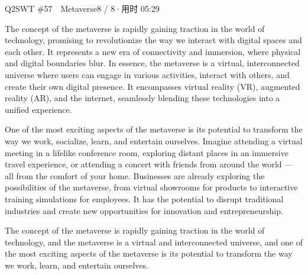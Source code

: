 \begin{qblock}{Q2\quad SWT \#57\ \ Metaverse}{8 / 8\quad·\quad 用时 05:29}

\begin{promptbox}
The concept of the metaverse is rapidly gaining traction in the world of technology, promising to revolutionize the way we interact with digital spaces and each other. It represents a new era of connectivity and immersion, where physical and digital boundaries blur. In essence, the metaverse is a virtual, interconnected universe where users can engage in various activities, interact with others, and create their own digital presence. It encompasses virtual reality (VR), augmented reality (AR), and the internet, seamlessly blending these technologies into a unified experience.

One of the most exciting aspects of the metaverse is its potential to transform the way we work, socialize, learn, and entertain ourselves. Imagine attending a virtual meeting in a lifelike conference room, exploring distant places in an immersive travel experience, or attending a concert with friends from around the world — all from the comfort of your home. Businesses are already exploring the possibilities of the metaverse, from virtual showrooms for products to interactive training simulations for employees. It has the potential to disrupt traditional industries and create new opportunities for innovation and entrepreneurship.
\end{promptbox}

\begin{youbox}
The concept of the metaverse is rapidly gaining traction in the world of technology, and the metaverse is a virtual and interconnected universe, and one of the most exciting aspects of the metaverse is its potential to transform the way we work, learn, and entertain ourselves.
\end{youbox}


\end{qblock}

